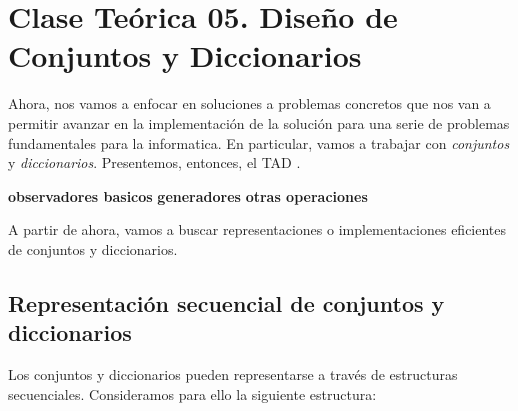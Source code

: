 \documentclass[10pt,a4paper]{article}
\begin{document}
\section{Clase Teórica 05. Diseño de Conjuntos y Diccionarios}

Ahora, nos vamos a enfocar en soluciones a problemas concretos que nos van a permitir avanzar en la implementación de la solución para una serie de problemas fundamentales para la informatica. En particular, vamos a trabajar con \textit{conjuntos} y \textit{diccionarios}.  
\newline
\newline
Presentemos, entonces, el TAD .
\newline
\begin{tad}{}
	\medskip	
        \textbf{observadores basicos}
        \medskip
 \medskip
	\medskip
        \medskip
        \textbf{generadores}
	\medskip
	\medskip
        \medskip
        \medskip
        \textbf{otras operaciones}
        \medskip
{}
	\medskip
	\medskip
	\medskip
\end{tad}
\medskip
\medskip
A partir de ahora, vamos a buscar representaciones o implementaciones eficientes de conjuntos y diccionarios.

\subsection{Representación secuencial de conjuntos y diccionarios}

Los conjuntos y diccionarios pueden representarse a través de estructuras secuenciales.
\newline
\newline
Consideramos para ello la siguiente estructura:
\end{document}
